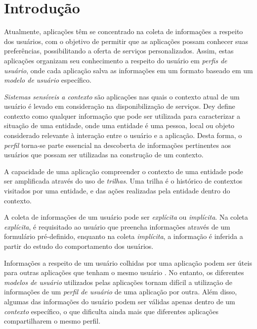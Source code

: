 \section{Introdução}


Atualmente, aplicações têm se concentrado na coleta de informações a respeito dos usuários, com o objetivo de permitir que as aplicações possam conhecer suas preferências, possibilitando a oferta de serviços personalizados. Assim, estas aplicações organizam seu conhecimento a respeito do usuário em \emph{perfis de usuário}, onde cada aplicação salva as informações em um formato baseado em um \emph{modelo de usuário} específico.\cite{viviani10}

\emph{Sistemas sensíveis a contexto} são aplicações nas quais o contexto atual de um usuário é levado em consideração na disponibilização de serviços. Dey\cite{dey2001} define contexto como qualquer informação que pode ser utilizada para caracterizar a situação de uma entidade, onde uma entidade é uma pessoa, local ou objeto considerado relevante à interação entre o usuário e a aplicação. Desta forma, o \emph{perfil} torna-se parte essencial na descoberta de informações pertinentes aos usuários que possam ser utilizadas na construção de um contexto.

A capacidade de uma aplicação compreender o contexto de uma entidade pode ser amplificada através do uso de \emph{trilhas}\cite{silva09}. Uma trilha é o histórico de contextos visitados por uma entidade, e das ações realizadas pela entidade dentro do contexto.


A coleta de informações de um usuário pode ser \emph{explícita} ou \emph{implícita}\cite{viviani10}. Na coleta \emph{explícita}, é requisitado ao usuário que preencha informações através de um formulário pré-definido, enquanto na coleta \emph{implícita}, a informação é inferida a partir do estudo do comportamento dos usuários.

Informações a respeito de um usuário colhidas por uma aplicação podem ser úteis para outras aplicações que tenham o mesmo usuário \cite{viviani10}. No entanto, os diferentes \emph{modelos de usuário} utilizados pelas aplicações tornam difícil a utilização de informações de um \emph{perfil de usuário} de uma aplicação por outra. Além disso, algumas das informações do usuário podem ser válidas apenas dentro de um \emph{contexto} específico, o que dificulta ainda mais que diferentes aplicações compartilharem o mesmo perfil.

